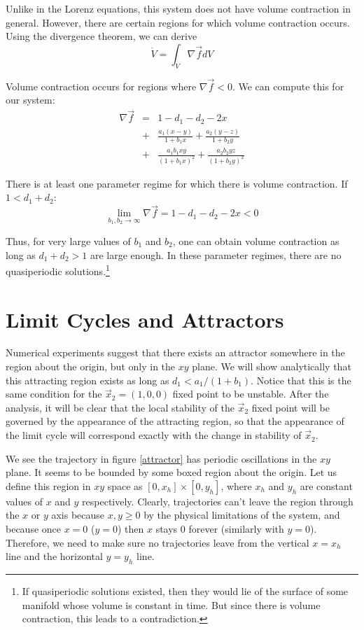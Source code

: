 \documentclass[12pt,journal,compsoc,twoside]{IEEEtran}
\begin{document}
Unlike in the Lorenz equations, this system does not have volume contraction in general. However, there are certain regions for which volume contraction occurs. Using the divergence theorem, we can derive
\begin{equation}
\dot{V} = \int_V \nabla \vec{f} dV
\end{equation}

Volume contraction occurs for regions where $\nabla \vec{f} < 0$. We can compute this for our system:
\begin{eqnarray}
\nabla \vec{f} &=& 1 - d_1 - d_2 - 2x \nonumber \\
&+& \frac{a_1 (x - y)}{1 + b_1 x} + \frac{a_2 (y - z)}{1 + b_2 y} \nonumber \\
&+& \frac{a_1 b_1 x y}{(1 + b_1 x)^2} + \frac{a_2 b_2 y z}{(1 + b_2 y)^2}
\end{eqnarray}

There is at least one parameter regime for which there is volume contraction. If $1 < d_1 + d_2$:
\begin{equation} 
\lim_{b_1, b_2 \to \infty} \nabla \vec{f} = 1 - d_1 - d_2 - 2x < 0
\end{equation}

Thus, for very large values of $b_1$ and $b_2$, one can obtain volume contraction as long as $d_1 + d_2 > 1$ are large enough. In these parameter regimes, there are no quasiperiodic solutions.\footnote{If quasiperiodic solutions existed, then they would lie of the surface of some manifold whose volume is constant in time. But since there is volume contraction, this leads to a contradiction.}

\section{Limit Cycles and Attractors}

Numerical experiments suggest that there exists an attractor somewhere in the region about the origin, but only in the $xy$ plane. We will show analytically that this attracting region exists as long as $d_1 < a_1 / (1 + b_1)$. Notice that this is the same condition for the $\vec{x}_2 = (1,0,0)$ fixed point to be unstable. After the analysis, it will be clear that the local stability of the $\vec{x}_2$ fixed point will be governed by the appearance of the attracting region, so that the appearance of the limit cycle will correspond exactly with the change in stability of $\vec{x}_2$. 

We see the trajectory in figure \ref{attractor} has periodic oscillations in the $xy$ plane. It seems to be bounded by some boxed region about the origin. Let us define this region in $xy$ space as $[0,x_h] \times [0, y_h]$, where $x_h$ and $y_h$ are constant values of $x$ and $y$ respectively. Clearly, trajectories can't leave the region through the $x$ or $y$ axis because $x,y \geq 0$ by the physical limitations of the system, and because once $x=0$ ($y = 0$) then $x$ stays 0 forever (similarly with $y = 0$). Therefore, we need to make sure no trajectories leave from the vertical $x = x_h$ line and the horizontal $y = y_h$ line. 
\end{document}
